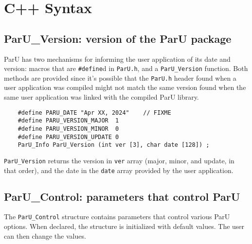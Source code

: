 \documentclass[12pt]{article}
\begin{document}
\section{C++ Syntax}

\subsection{{\sf ParU\_Version}: version of the ParU package}

    ParU has two mechanisms for informing the user application of its date and
    version: macros that are \verb'#define'd in \verb'ParU.h', and a
    \verb'ParU_Version' function.  Both methods are provided since it's
    possible that the \verb'ParU.h' header found when a user application was
    compiled might not match the same version found when the same user
    application was linked with the compiled ParU library.

    {\footnotesize
    \begin{verbatim}
    #define PARU_DATE "Apr XX, 2024"    // FIXME
    #define PARU_VERSION_MAJOR  1
    #define PARU_VERSION_MINOR  0
    #define PARU_VERSION_UPDATE 0
    ParU_Info ParU_Version (int ver [3], char date [128]) ; \end{verbatim}}

    \verb'ParU_Version' returns the version in \verb'ver' array (major, minor,
    and update, in that order), and the date in the \verb'date' array provided
    by the user application.

\subsection{{\sf ParU\_Control}: parameters that control ParU}

    The \verb'ParU_Control' structure contains parameters that control various
    ParU options.  When declared, the structure is initialized with default
    values.  The user can then change the values.
\end{document}
